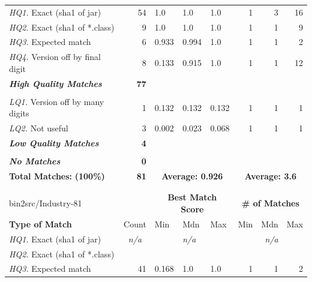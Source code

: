 \begin{table}[h]
\begin{tabular}[htbp]{l|r|lll|rrr}
  \hline
  \emph{HQ1.} Exact (sha1 of jar)        & 54           & 1.0   & 1.0    & 1.0   & 1    & 3    & 16   \\
  \emph{HQ2.} Exact (sha1 of *.class)    &  9           & 1.0   & 1.0    & 1.0   & 1    & 1    &  9   \\
  \emph{HQ3.} Expected match             &  6           & 0.933 & 0.994  & 1.0   & 1    & 1    &  2   \\
  \emph{HQ4.} Version off by final digit &  8           & 0.133 & 0.915  & 1.0   & 1    & 1    & 12   \\
  \emph{\textbf{High Quality Matches}}   & \textbf{77}  &       &        &       &      &      &      \\
& & & & & & & \\
  \emph{LQ1.} Version off by many digits &  1           & 0.132 & 0.132  & 0.132 & 1    & 1    &  1   \\
  \emph{LQ2.} Not useful                 &  3           & 0.002 & 0.023  & 0.068 & 1    & 1    &  1   \\
  \emph{\textbf{Low Quality Matches}}    & \textbf{4}   &       &        &       &      &      &      \\
& & & & & & & \\
  \emph{\textbf{No Matches}}             & \textbf{0}   &       &        &       &      &      &      \\
  \hline
  \textbf{Total Matches:} \hspace{2.5em} \textbf{(100\%)} & \textbf{81}  & \multicolumn{3}{c|}{\textbf{Average: 0.926}}  & \multicolumn{3}{c}{\textbf{Average: 3.6}} \\
   \multicolumn{8}{c}{} \\
   \multicolumn{8}{c}{} \\
  bin2src/Industry-81                    &              & \multicolumn{3}{c|}{\textbf{Best Match Score}}  & \multicolumn{3}{c}{\textbf{\# of Matches}} \\
  \textbf{Type of Match}                 & Count        & Min   & Mdn    & Max   & Min  & Mdn  & Max  \\
  \hline
  \emph{HQ1.} Exact (sha1 of jar)        & \multicolumn{1}{c|}{\emph{n/a}} & & \emph{n/a} & & & \emph{n/a} &  \\
  \emph{HQ2.} Exact (sha1 of *.class)    & & & & & & & \\
  \emph{HQ3.} Expected match             &  41          & 0.168 & 1.0    & 1.0   & 1    & 1    &  2   \\

\end{tabular}
\end{table}
